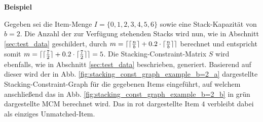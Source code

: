 \textbf{Beispiel}

Gegeben sei die Item-Menge $I = \{0, 1, 2, 3, 4, 5, 6\}$ sowie eine Stack-Kapazität von $b = 2$.
Die Anzahl der zur Verfügung stehenden Stacks wird nun, wie in Abschnitt \ref{sec:test_data} geschildert,
durch $m = \lceil\lceil\frac{n}{b}\rceil + 0.2 \cdot \lceil\frac{n}{b}\rceil\rceil$ berechnet und entspricht somit
$m = \lceil\lceil\frac{7}{2}\rceil + 0.2 \cdot \lceil\frac{7}{2}\rceil\rceil = 5$.
Die Stacking-Constraint-Matrix $S$ wird ebenfalls, wie in Abschnitt \ref{sec:test_data} beschrieben, generiert.
Basierend auf dieser wird der in Abb. \ref{fig:stacking_const_graph_example_b=2_a} dargestellte Stacking-Constraint-Graph
für die gegebenen Items eingeführt, auf welchem anschließend das in Abb. \ref{fig:stacking_const_graph_example_b=2_b} in grün dargestellte \textsc{MCM} berechnet wird. Das in rot dargestellte Item $4$ verbleibt dabei als einziges Unmatched-Item.
